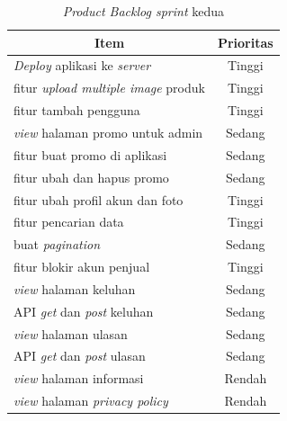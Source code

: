 \begin{enumerate}


	\begin{table}[H]
		\begin{center}
		\caption{\textit{Product Backlog sprint} kedua}
		\label{tab:sprint kedua}
		\begin{tabular}{|l|c|}
		\hline
		\multicolumn{1}{|c|}{Item} & Prioritas\\
		\hline
		\textit{Deploy} aplikasi ke \textit{server} & Tinggi\\
		\hline
		fitur \textit{upload multiple image} produk & Tinggi\\
		\hline
		fitur tambah pengguna & Tinggi\\
		\hline
		\textit{view} halaman promo untuk admin & Sedang\\
		\hline
		fitur buat promo di aplikasi & Sedang\\
		\hline
		fitur ubah dan hapus promo & Sedang\\
		\hline
		fitur ubah profil akun dan foto & Tinggi\\
		\hline
		fitur pencarian data & Tinggi\\
		\hline
		buat \textit{pagination} & Sedang\\
		\hline
		fitur blokir akun penjual & Tinggi\\
		\hline
		\textit{view} halaman keluhan & Sedang\\
		\hline
		API \textit{get} dan \textit{post} keluhan & Sedang\\
		\hline
		\textit{view} halaman ulasan & Sedang\\
		\hline
		API \textit{get} dan \textit{post} ulasan & Sedang\\
		\hline
		\textit{view} halaman informasi & Rendah\\
		\hline
		\textit{view} halaman \textit{privacy policy} & Rendah\\
		\hline
		\end{tabular}
		\end{center}
	\end{table}


\end{enumerate}
